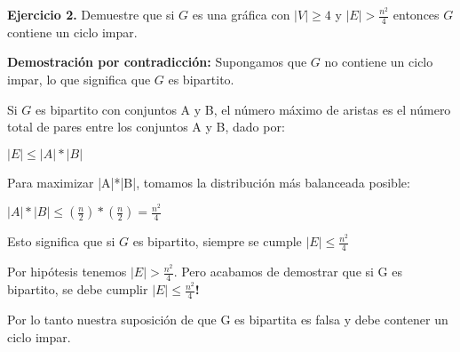 \textbf{Ejercicio 2.} Demuestre que si $G$ es una gráfica con $|V|\geq 4$ y $|E| > \frac{n^2}{4}$ entonces $G$ contiene un ciclo impar.

\textbf{Demostración por contradicción:} Supongamos que $G$ no contiene un ciclo impar, lo que significa que $G$ es bipartito.

Si $G$ es bipartito con conjuntos A y B, el número máximo de aristas es el número total de pares entre los conjuntos A y B, dado por:

$|E| \leq |A|*|B|$

Para maximizar |A|*|B|, tomamos la distribución más balanceada posible:

$|A|*|B| \leq (\frac{n}{2})*(\frac{n}{2})=\frac{n^2}{4}$

Esto significa que si $G$ es bipartito, siempre se cumple $|E| \leq \frac{n^2}{4}$

Por hipótesis tenemos $|E| > \frac{n^2}{4}$. Pero acabamos de demostrar que si G es bipartito, se debe cumplir $|E| \leq \frac{n^2}{4}$\textbf{!}

Por lo tanto nuestra suposición de que G es bipartita es falsa y debe contener un ciclo impar.

\QED